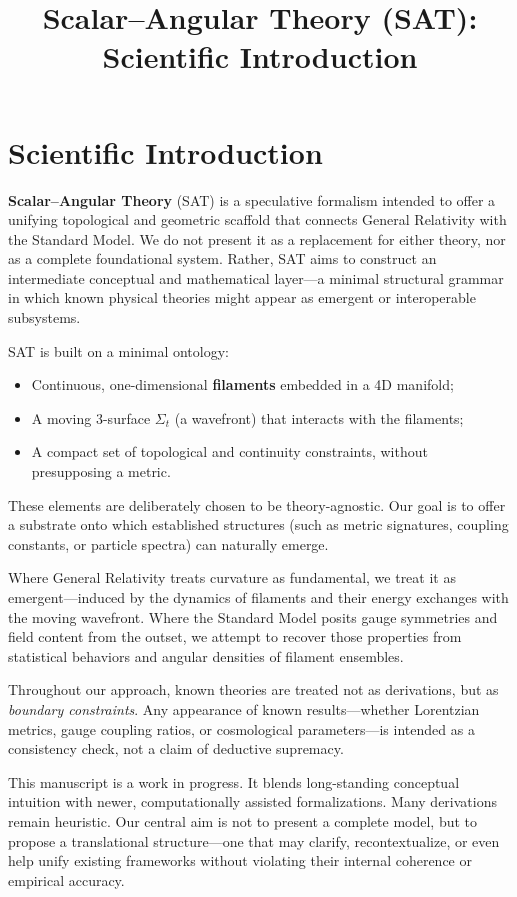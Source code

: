 \documentclass[12pt]{article}
\title{Scalar--Angular Theory (SAT): Scientific Introduction}
\author{}
\date{}
\begin{document}
\maketitle

\section*{Scientific Introduction}

\textbf{Scalar--Angular Theory} (SAT) is a speculative formalism intended to offer a unifying topological and geometric scaffold that connects General Relativity with the Standard Model. We do not present it as a replacement for either theory, nor as a complete foundational system. Rather, SAT aims to construct an intermediate conceptual and mathematical layer---a minimal structural grammar in which known physical theories might appear as emergent or interoperable subsystems.

SAT is built on a minimal ontology:
\begin{itemize}
  \item Continuous, one-dimensional \textbf{filaments} embedded in a 4D manifold;
  \item A moving 3-surface \(\Sigma_t\) (a wavefront) that interacts with the filaments;
  \item A compact set of topological and continuity constraints, without presupposing a metric.
\end{itemize}

These elements are deliberately chosen to be theory-agnostic. Our goal is to offer a substrate onto which established structures (such as metric signatures, coupling constants, or particle spectra) can naturally emerge.

Where General Relativity treats curvature as fundamental, we treat it as emergent---induced by the dynamics of filaments and their energy exchanges with the moving wavefront. Where the Standard Model posits gauge symmetries and field content from the outset, we attempt to recover those properties from statistical behaviors and angular densities of filament ensembles.

Throughout our approach, known theories are treated not as derivations, but as \textit{boundary constraints}. Any appearance of known results---whether Lorentzian metrics, gauge coupling ratios, or cosmological parameters---is intended as a consistency check, not a claim of deductive supremacy.

This manuscript is a work in progress. It blends long-standing conceptual intuition with newer, computationally assisted formalizations. Many derivations remain heuristic. Our central aim is not to present a complete model, but to propose a translational structure---one that may clarify, recontextualize, or even help unify existing frameworks without violating their internal coherence or empirical accuracy.
\end{document}

